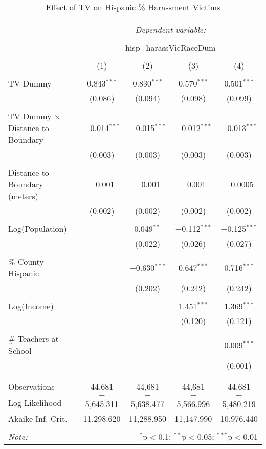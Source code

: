
\begin{table}[!htbp] \centering 
  \caption{Effect of TV on Hispanic \% Harassment Victims} 
  \label{} 
\begin{tabular}{@{\extracolsep{-2pt}}lcccc} 
\\[-1.8ex]\hline 
\hline \\[-1.8ex] 
 & \multicolumn{4}{c}{\textit{Dependent variable:}} \\ 
\cline{2-5} 
\\[-1.8ex] & \multicolumn{4}{c}{hisp\_harassVicRaceDum} \\ 
\\[-1.8ex] & (1) & (2) & (3) & (4)\\ 
\hline \\[-1.8ex] 
 TV Dummy & 0.843$^{***}$ & 0.830$^{***}$ & 0.570$^{***}$ & 0.501$^{***}$ \\ 
  & (0.086) & (0.094) & (0.098) & (0.099) \\ 
  & & & & \\ 
 TV Dummy $\times$ Distance to Boundary & $-$0.014$^{***}$ & $-$0.015$^{***}$ & $-$0.012$^{***}$ & $-$0.013$^{***}$ \\ 
  & (0.003) & (0.003) & (0.003) & (0.003) \\ 
  & & & & \\ 
 Distance to Boundary (meters) & $-$0.001 & $-$0.001 & $-$0.001 & $-$0.0005 \\ 
  & (0.002) & (0.002) & (0.002) & (0.002) \\ 
  & & & & \\ 
 Log(Population) &  & 0.049$^{**}$ & $-$0.112$^{***}$ & $-$0.125$^{***}$ \\ 
  &  & (0.022) & (0.026) & (0.027) \\ 
  & & & & \\ 
 \% County Hispanic &  & $-$0.630$^{***}$ & 0.647$^{***}$ & 0.716$^{***}$ \\ 
  &  & (0.202) & (0.242) & (0.242) \\ 
  & & & & \\ 
 Log(Income) &  &  & 1.451$^{***}$ & 1.369$^{***}$ \\ 
  &  &  & (0.120) & (0.121) \\ 
  & & & & \\ 
 \# Teachers at School &  &  &  & 0.009$^{***}$ \\ 
  &  &  &  & (0.001) \\ 
  & & & & \\ 
\hline \\[-1.8ex] 
Observations & 44,681 & 44,681 & 44,681 & 44,681 \\ 
Log Likelihood & $-$5,645.311 & $-$5,638.477 & $-$5,566.996 & $-$5,480.219 \\ 
Akaike Inf. Crit. & 11,298.620 & 11,288.950 & 11,147.990 & 10,976.440 \\ 
\hline 
\hline \\[-1.8ex] 
\textit{Note:}  & \multicolumn{4}{r}{$^{*}$p$<$0.1; $^{**}$p$<$0.05; $^{***}$p$<$0.01} \\ 
\end{tabular} 
\end{table} 
